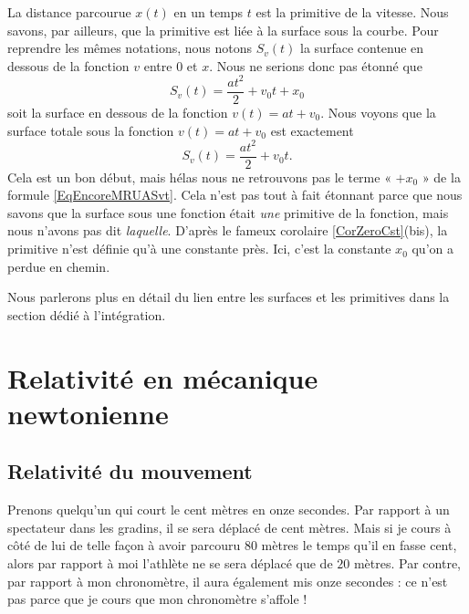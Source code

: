 La distance parcourue \( x(t)\) en un temps \( t\) est la primitive de la vitesse. Nous savons, par ailleurs, que la primitive est liée à la surface sous la courbe. Pour reprendre les mêmes notations, nous notons \( S_v(t)\) la surface contenue en dessous de la fonction \( v\) entre \( 0\) et \( x\). Nous ne serions donc pas étonné que
\begin{equation}        \label{EqEncoreMRUASvt}
	S_v(t) = \frac{ at^2 }{ 2 }+v_0t+x_0
\end{equation}
soit la surface en dessous de la fonction \( v(t)=at+v_0\). Nous voyons que la surface totale sous la fonction \( v(t)=at+v_0\) est exactement
\begin{equation}
	S_v(t)=\frac{ at^2 }{ 2 }+v_0t.
\end{equation}
Cela est un bon début, mais hélas nous ne retrouvons pas le terme « \( +x_0\) » de la formule \eqref{EqEncoreMRUASvt}. Cela n'est pas tout à fait étonnant parce que nous savons que la surface sous une fonction était \emph{une} primitive de la fonction, mais nous n'avons pas dit \emph{laquelle}. D'après le fameux corolaire \ref{CorZeroCst}(bis), la primitive n'est définie qu'à une constante près. Ici, c'est la constante \( x_0\) qu'on a perdue en chemin.

Nous parlerons plus en détail du lien entre les surfaces et les primitives dans la section dédié à l'intégration.

\section{Relativité en mécanique newtonienne}

\subsection{Relativité du mouvement}

Prenons quelqu'un qui court le cent mètres en onze secondes. Par rapport à un spectateur dans les gradins, il se sera déplacé de cent mètres. Mais si je cours à côté de lui de telle façon à avoir parcouru \( 80\) mètres le temps qu'il en fasse cent, alors par rapport à moi l'athlète ne se sera déplacé que de \( 20\) mètres. Par contre, par rapport à mon chronomètre, il aura également mis onze secondes : ce n'est pas parce que je cours que mon chronomètre s'affole !

